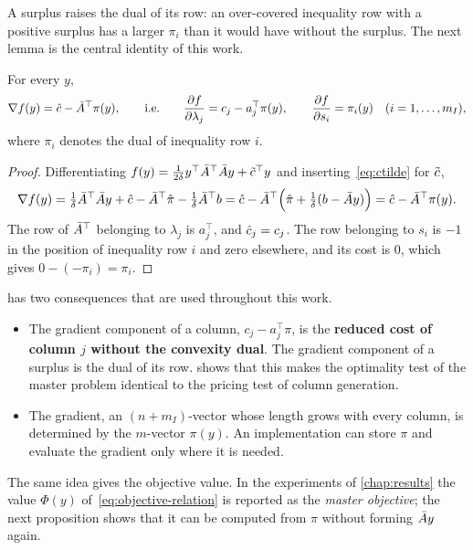A surplus raises the dual of its row: an over-covered inequality row with a positive surplus
has a larger $\pi_i$ than it would have without the surplus. The next lemma is the central
identity of this work.

\begin{lemma} \label{lem:gradient-dual}
For every $y$,
\begin{equation} \label{eq:gradient-dual}
\nabla f(y) = \hat{c} - \bar{A}^\top\pi(y),
\qquad\text{i.e.}\qquad
\frac{\partial f}{\partial\lambda_j} = c_j - a_j^\top\pi(y), \qquad
\frac{\partial f}{\partial s_i} = \pi_i(y)\quad (i = 1,\dots,m_I),
\end{equation}
where $\pi_i$ denotes the dual of inequality row $i$.
\end{lemma}

\begin{proof}
Differentiating $f(y) = \frac{1}{2\delta}y^\top\bar{A}^\top\bar{A} y + \tilde{c}^\top y$ and
inserting~\eqref{eq:ctilde} for $\tilde{c}$,
\[
\nabla f(y) = \tfrac{1}{\delta}\bar{A}^\top\bar{A} y + \hat{c} - \bar{A}^\top\hat{\pi} - \tfrac{1}{\delta}\bar{A}^\top b
= \hat{c} - \bar{A}^\top\Bigl(\hat{\pi} + \tfrac{1}{\delta}(b - \bar{A} y)\Bigr)
= \hat{c} - \bar{A}^\top\pi(y).
\]
The row of $\bar{A}^\top$ belonging to $\lambda_j$ is $a_j^\top$, and $\hat{c}_j = c_j$. The row
belonging to $s_i$ is $-1$ in the position of inequality row $i$ and zero elsewhere, and its
cost is $0$, which gives $0 - (-\pi_i) = \pi_i$.
\end{proof}

 has two consequences that are used throughout this work.
\begin{itemize}
    \item The gradient component of a column, $c_j - a_j^\top\pi$, is the \textbf{reduced cost
          of column $j$ without the convexity dual}. The gradient component of a surplus is the
          dual of its row.  shows that this makes the optimality test of the
          master problem identical to the pricing test of column generation.
    \item The gradient, an $(n+m_I)$-vector whose length grows with every column, is
          determined by the $m$-vector $\pi(y)$. An implementation can store $\pi$ and
          evaluate the gradient only where it is needed.
\end{itemize}

The same idea gives the objective value. In the experiments of \cref{chap:results} the value
$\Phi(y)$ of~\eqref{eq:objective-relation} is reported as the \emph{master objective}; the
next proposition shows that it can be computed from $\pi$ without forming $\bar{A} y$ again.

